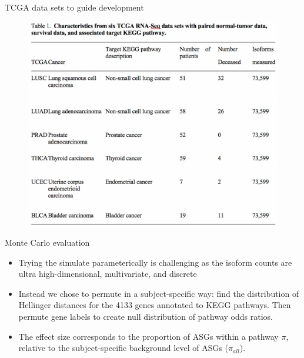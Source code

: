 \documentclass[ignorenonframetext,aspectratio=169,]{beamer}
\begin{document}
\begin{frame}{%
\protect\hypertarget{tcga-data-sets-to-guide-development}{%
TCGA data sets to guide development}}

\begin{figure}[htb]
  \centering \includegraphics[keepaspectratio,width=\textwidth,height=0.8\textheight]{../n1pas/figures/datasets.png}
\end{figure}

\end{frame}

\begin{frame}{%
\protect\hypertarget{monte-carlo-evaluation}{%
Monte Carlo evaluation}}

\begin{itemize}
        \setlength\itemsep{1em}
  \item Trying the simulate parameterically is challenging as the isoform counts are ultra high-dimensional, multivariate, and discrete
  \item Instead we chose to permute in a subject-specific way: find the distribution of Hellinger distances for the 4133 genes annotated to KEGG pathways. Then permute gene labels to create null distribution of pathway odds ratios.
    \item The effect size corresponds to the proportion of ASGs within a pathway $\pi$, relative to the subject-specific background level of ASGs ($\pi_{all}$).
  \end{itemize}

\end{frame}
\end{document}
